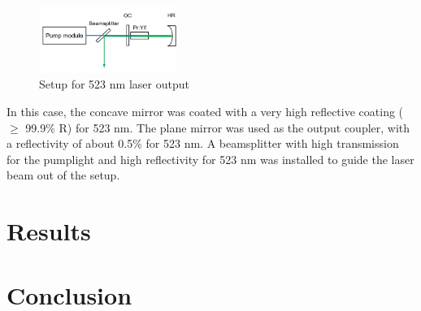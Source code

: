 \documentclass[conference]{IEEEtran}
\begin{document}
\begin{figure}[h]
	\centering
	\includegraphics[width=0.4\textwidth]{img/setup523}
	\caption{Setup for 523 nm laser output}
	\label{setup523}
\end{figure}
In this case, the concave mirror was coated with a very high reflective coating ($\geq$ 99.9\% R) for 523 nm. The plane mirror was used as the output coupler, with a reflectivity of about 0.5\% for 523 nm. A beamsplitter with high transmission for the pumplight and high reflectivity for 523 nm was installed to guide the laser beam out of the setup. 
\section{Results}
\section{Conclusion}
\printbibliography
\end{document}
